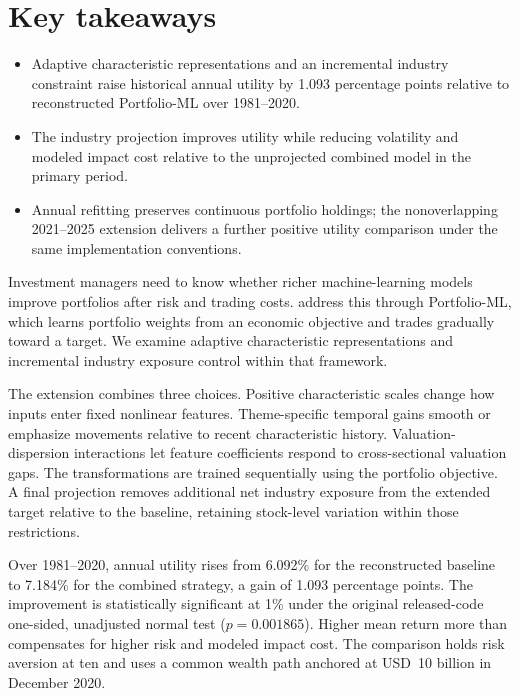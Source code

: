 \documentclass[12pt,letterpaper,fleqn]{article}
\begin{document}
\section*{Key takeaways}
\begin{itemize}
\setlength{\itemsep}{0pt}\setlength{\parskip}{0pt}
\item Adaptive characteristic representations and an incremental industry constraint raise historical annual utility by 1.093 percentage points relative to reconstructed Portfolio-ML over 1981--2020.
\item The industry projection improves utility while reducing volatility and modeled impact cost relative to the unprojected combined model in the primary period.
\item Annual refitting preserves continuous portfolio holdings; the nonoverlapping 2021--2025 extension delivers a further positive utility comparison under the same implementation conventions.
\end{itemize}
\clearpage
Investment managers need to know whether richer machine-learning models improve portfolios after risk and trading costs. \citet{jensen2026} address this through Portfolio-ML, which learns portfolio weights from an economic objective and trades gradually toward a target. We examine adaptive characteristic representations and incremental industry exposure control within that framework.

The extension combines three choices. Positive characteristic scales change how inputs enter fixed nonlinear features. Theme-specific temporal gains smooth or emphasize movements relative to recent characteristic history. Valuation-dispersion interactions let feature coefficients respond to cross-sectional valuation gaps. The transformations are trained sequentially using the portfolio objective. A final projection removes additional net industry exposure from the extended target relative to the baseline, retaining stock-level variation within those restrictions.

Over 1981--2020, annual utility rises from 6.092\% for the reconstructed baseline to 7.184\% for the combined strategy, a gain of 1.093 percentage points. The improvement is statistically significant at 1\% under the original released-code one-sided, unadjusted normal test ($p=0.001865$). Higher mean return more than compensates for higher risk and modeled impact cost. The comparison holds risk aversion at ten and uses a common wealth path anchored at USD~10 billion in December 2020.
\end{document}
